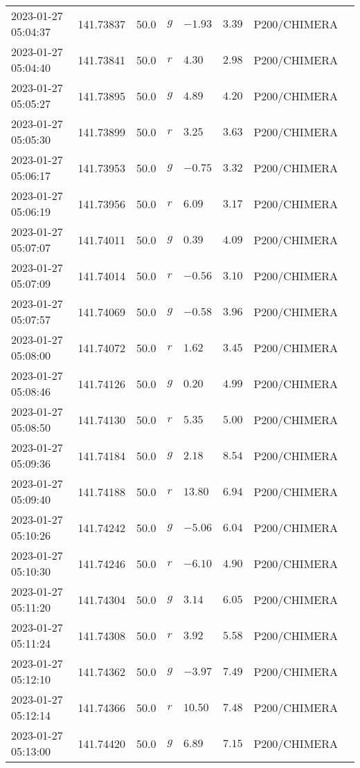 \documentclass{nature_plusfigure}
\begin{document}
\begin{supplement}
\begin{center}
\begin{longtable}{llllllll}
2023-01-27 05:04:37 & 141.73837 & 50.0 & $g$ & $-1.93$ & $3.39$ & P200/CHIMERA &  \\ 
2023-01-27 05:04:40 & 141.73841 & 50.0 & $r$ & $4.30$ & $2.98$ & P200/CHIMERA &  \\ 
2023-01-27 05:05:27 & 141.73895 & 50.0 & $g$ & $4.89$ & $4.20$ & P200/CHIMERA &  \\ 
2023-01-27 05:05:30 & 141.73899 & 50.0 & $r$ & $3.25$ & $3.63$ & P200/CHIMERA &  \\ 
2023-01-27 05:06:17 & 141.73953 & 50.0 & $g$ & $-0.75$ & $3.32$ & P200/CHIMERA &  \\ 
2023-01-27 05:06:19 & 141.73956 & 50.0 & $r$ & $6.09$ & $3.17$ & P200/CHIMERA &  \\ 
2023-01-27 05:07:07 & 141.74011 & 50.0 & $g$ & $0.39$ & $4.09$ & P200/CHIMERA &  \\ 
2023-01-27 05:07:09 & 141.74014 & 50.0 & $r$ & $-0.56$ & $3.10$ & P200/CHIMERA &  \\ 
2023-01-27 05:07:57 & 141.74069 & 50.0 & $g$ & $-0.58$ & $3.96$ & P200/CHIMERA &  \\ 
2023-01-27 05:08:00 & 141.74072 & 50.0 & $r$ & $1.62$ & $3.45$ & P200/CHIMERA &  \\ 
2023-01-27 05:08:46 & 141.74126 & 50.0 & $g$ & $0.20$ & $4.99$ & P200/CHIMERA &  \\ 
2023-01-27 05:08:50 & 141.74130 & 50.0 & $r$ & $5.35$ & $5.00$ & P200/CHIMERA &  \\ 
2023-01-27 05:09:36 & 141.74184 & 50.0 & $g$ & $2.18$ & $8.54$ & P200/CHIMERA &  \\ 
2023-01-27 05:09:40 & 141.74188 & 50.0 & $r$ & $13.80$ & $6.94$ & P200/CHIMERA &  \\ 
2023-01-27 05:10:26 & 141.74242 & 50.0 & $g$ & $-5.06$ & $6.04$ & P200/CHIMERA &  \\ 
2023-01-27 05:10:30 & 141.74246 & 50.0 & $r$ & $-6.10$ & $4.90$ & P200/CHIMERA &  \\ 
2023-01-27 05:11:20 & 141.74304 & 50.0 & $g$ & $3.14$ & $6.05$ & P200/CHIMERA &  \\ 
2023-01-27 05:11:24 & 141.74308 & 50.0 & $r$ & $3.92$ & $5.58$ & P200/CHIMERA &  \\ 
2023-01-27 05:12:10 & 141.74362 & 50.0 & $g$ & $-3.97$ & $7.49$ & P200/CHIMERA &  \\ 
2023-01-27 05:12:14 & 141.74366 & 50.0 & $r$ & $10.50$ & $7.48$ & P200/CHIMERA &  \\ 
2023-01-27 05:13:00 & 141.74420 & 50.0 & $g$ & $6.89$ & $7.15$ & P200/CHIMERA &  \\ 

\end{longtable}
\end{center}
\end{supplement}
\end{document}
